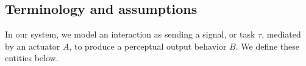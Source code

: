 \documentclass{sigchi}
\begin{document}
 

  
  \subsection{Terminology and assumptions} \label{sec:terms}
  In our system, we model an interaction as sending a signal, or task $\tau$, mediated by an actuator $A$, to produce a perceptual output behavior $B$. We define these entities below.
\end{document}
